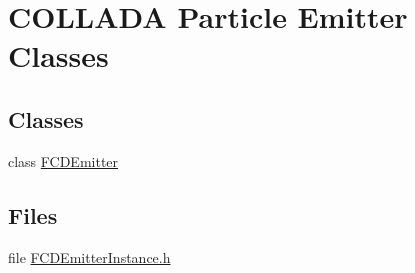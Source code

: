 \hypertarget{group__FCDEmitters}{
\section{COLLADA Particle Emitter Classes}
\label{group__FCDEmitters}
}
\subsection*{Classes}
\begin{DoxyCompactItemize}
\item 
class \hyperlink{classFCDEmitter}{FCDEmitter}
\end{DoxyCompactItemize}
\subsection*{Files}
\begin{DoxyCompactItemize}
\item 
file \hyperlink{FCDEmitterInstance_8h}{FCDEmitterInstance.h}
\end{DoxyCompactItemize}
